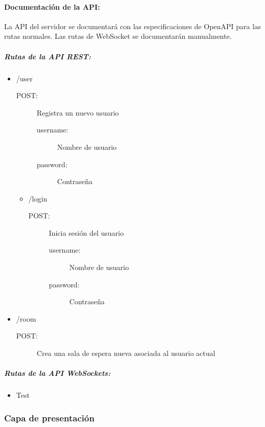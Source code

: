\paragraph{Documentación de la API:}

La API del servidor se documentará con las especificaciones de OpenAPI para las rutas normales.
Las rutas de WebSocket se documentarán manualmente.

\subparagraph{Rutas de la API REST:}

\begin{itemize}
  \item /user
    \begin{description}
      \item[POST:] Registra un nuevo usuario
        \begin{description}
          \item[username:] Nombre de usuario
          \item[password:] Contraseña
        \end{description}
    \end{description}
    \begin{itemize}
      \item /login
        \begin{description}
          \item[POST:] Inicia sesión del usuario
            \begin{description}
              \item[username:] Nombre de usuario
              \item[password:] Contraseña
            \end{description}
        \end{description}
    \end{itemize}
  \item /room
      \begin{description}
      \item[POST:] Crea una sala de espera nueva asociada al usuario actual
      \end{description}
\end{itemize}
\subparagraph{Rutas de la API WebSockets:}
\begin{itemize}
  \item Test
\end{itemize}

\subsubsection{Capa de presentación}

